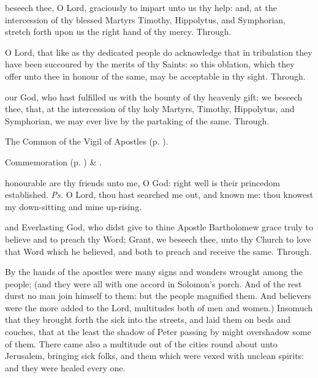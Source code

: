 \collect
{} beseech thee, O Lord, graciously to impart unto us thy help: and, at the intercession of thy blessed Martyrs Timothy, Hippolytus, and Symphorian, stretch forth upon us the right hand of thy mercy. Through.

\secret
{} O Lord, that like as thy dedicated people do acknowledge that in tribulation they have been succoured by the merits of thy Saints: so this oblation, which they offer unto thee in honour of the same, may be acceptable in thy sight. Through.

\postcommunion
{} our God, who hast fulfilled us with the bounty of thy heavenly gift: we beseech thee, that, at the intercession of thy holy Martyrs, Timothy, Hippolytus, and Symphorian, we may ever live by the partaking of the same. Through.


\clearpage
{}

\begin{rubric}
	The Common of the Vigil of Apostles (p. \pageref{CommonVigilApostles}).
\end{rubric}
\begin{rubric}
	Commemoration  (p. \pageref{SPSaints}) \& .
\end{rubric}



\introit
{} honourable are thy friends unto me, O God: right well is their princedom established. \textit{Ps.} O Lord, thou hast searched me out, and known me: thou knowest my down-sitting and mine up-rising.

\collect
{} and Everlasting God, who didst give to thine Apostle Bartholomew grace truly to believe and to preach thy Word; Grant, we beseech thee, unto thy Church to love that Word which he believed, and both to preach and receive the same. Through.

 By the hands of the apostles were many signs and wonders wrought among the people; (and they were all with one accord in Solomon's porch. And of the rest durst no man join himself to them: but the people magnified them. And believers were the more added to the Lord, multitudes both of men and women.) Insomuch that they brought forth the sick into the streets, and laid them on beds and couches, that at the least the shadow of Peter passing by might overshadow some of them. There came also a multitude out of the cities round about unto Jerusalem, bringing sick folks, and them which were vexed with unclean spirits: and they were healed every one.

